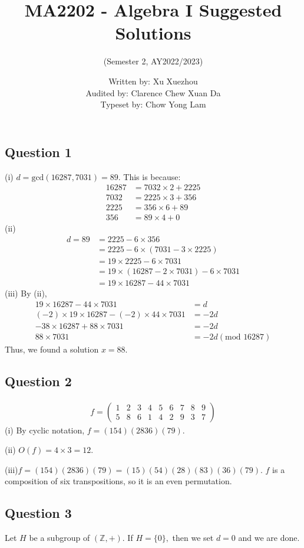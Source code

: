 \documentclass{article}
\title{MA2202 - Algebra I Suggested Solutions}
\author{(Semester 2, AY2022/2023)}
\date{Written by: Xu Xuezhou\\Audited by: Clarence Chew Xuan Da\\Typeset by: Chow Yong Lam}
\begin{document}
\maketitle
\subsection*{Question 1}

(i) $d = \text{gcd}(16287, 7031) = 89$. This is because:\begin{align*}
    16287 &= 7032\times2+2225\\
    7032 &= 2225\times3 + 356\\
    2225 &= 356\times6+89\\
    356 &= 89\times4 + 0
\end{align*}
(ii)
\begin{align*}
    d = 89 &= 2225-6\times356\\
    &= 2225-6\times(7031-3\times2225)\\
    &= 19\times2225 -6\times7031\\
    &= 19\times(16287-2\times7031)-6\times7031\\
    &= 19\times16287-44\times7031
\end{align*}
(iii) By (ii),
\begin{align*}
    19\times16287-44\times7031 &= d\\
    (-2)\times19\times16287 - (-2)\times44\times7031 &=-2d\\
    -38\times16287+88\times7031 &=-2d\\
    88\times7031 &= -2d (\text{mod } 16287)
\end{align*}Thus, we found a solution $x=88.$

\subsection*{Question 2}
\begin{align*}
	f = \left(
	\begin{array}{ccccccccc}
		1&2&3&4&5&6&7&8&9\\5&8&6&1&4&2&9&3&7
	\end{array}
	\right)
\end{align*}
(i) By cyclic notation, $f=(154)(2836)(79)$.

(ii) $O(f) = 4\times3=12$.

(iii)$f=(154)(2836)(79)=(15)(54)(28)(83)(36)(79)$. $f$ is a composition of six transpositions, so it is an even permutation.

\subsection*{Question 3}
Let $H$ be a subgroup of $(\mathbb Z,+)$. If $H=\{0\},$ then we set $d=0$ and we are done. 
\end{document}
